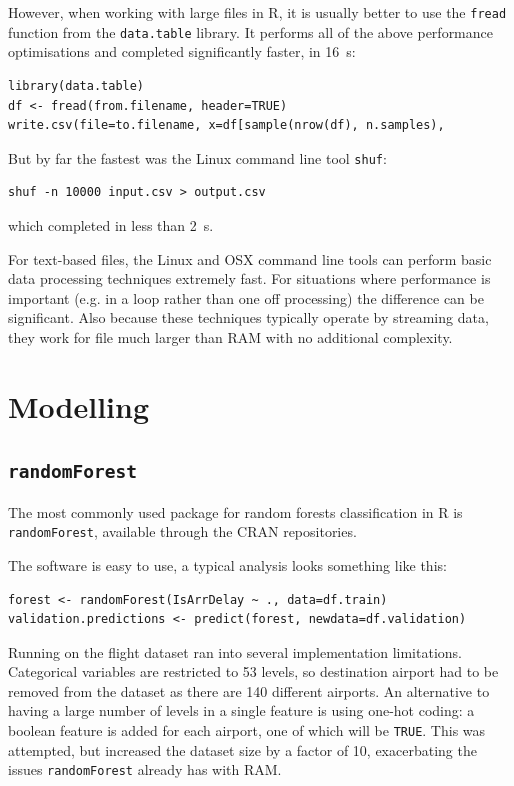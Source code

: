 \documentclass{article}
\begin{document}
However, when working with large files in R, it is usually better to use the \texttt{fread} function from the \texttt{data.table} library. It performs all of the above performance optimisations and completed significantly faster, in \SI{16}{\second}:
\begin{lstlisting}[frame=single, basicstyle=\footnotesize\ttfamily]
library(data.table)
df <- fread(from.filename, header=TRUE)
write.csv(file=to.filename, x=df[sample(nrow(df), n.samples),
\end{lstlisting}


But by far the fastest was the Linux command line tool \texttt{shuf}:
\begin{lstlisting}[frame=single, basicstyle=\footnotesize\ttfamily]
shuf -n 10000 input.csv > output.csv
\end{lstlisting}
which completed in less than \SI{2}{\second}.


For text-based files, the Linux and OSX command line tools can perform basic data processing techniques extremely fast. For situations where performance is important (e.g. in a loop rather than one off processing) the difference can be significant. Also because these techniques typically operate by streaming data, they work for file much larger than RAM with no additional complexity.


\section{Modelling}
\subsection{\texttt{randomForest}}
The most commonly used package for random forests classification in R is \texttt{randomForest}, available through the CRAN repositories.

The software is easy to use, a typical analysis looks something like this:

\begin{lstlisting}[frame=single, basicstyle=\footnotesize\ttfamily]
forest <- randomForest(IsArrDelay ~ ., data=df.train)
validation.predictions <- predict(forest, newdata=df.validation)
\end{lstlisting}

Running on the flight dataset ran into several implementation limitations. Categorical variables are restricted to 53 levels, so destination airport had to be removed from the dataset as there are 140 different airports. An alternative to having a large number of levels in a single feature is using one-hot coding: a boolean feature is added for each airport, one of which will be \texttt{TRUE}. This was attempted, but increased the dataset size by a factor of 10, exacerbating the issues \texttt{randomForest} already has with RAM.
\end{document}

